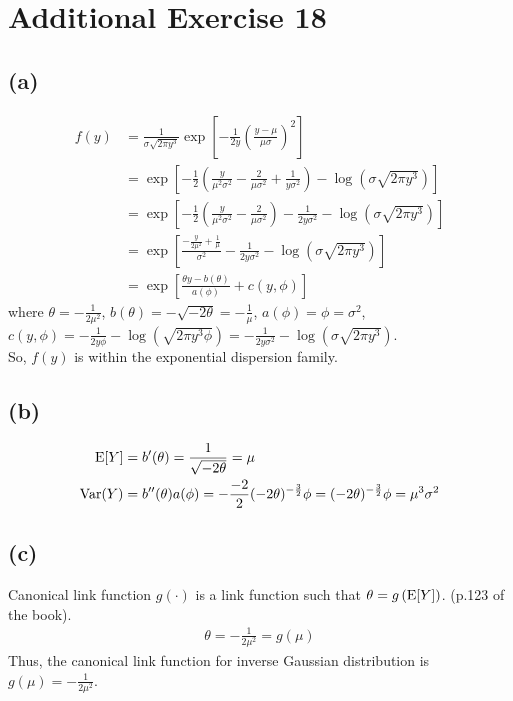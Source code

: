 \section*{Additional Exercise 18}
\subsection*{(a)}

\begin{align*}
f(y) &= \frac{1}{\sigma\sqrt{2\pi y^{3}}}\exp\left[-\frac{1}{2y}\left(\frac{y-\mu}{\mu\sigma}\right)^{2}\right]\\
&= \exp\left[-\frac{1}{2}\left(\frac{y}{\mu^{2}\sigma^{2}} -\frac{2}{\mu\sigma^{2}} + \frac{1}{y\sigma^{2}}\right) -\log\left(\sigma\sqrt{2\pi y^{3}}\right)\right]\\
&= \exp\left[-\frac{1}{2}\left(\frac{y}{\mu^{2}\sigma^{2}} -\frac{2}{\mu\sigma^{2}}\right) -\frac{1}{2y\sigma^{2}} -\log\left(\sigma\sqrt{2\pi y^{3}}\right)\right]\\
&= \exp\left[\frac{-\frac{y}{2\mu^{2}} +\frac{1}{\mu}}{\sigma^{2}} -\frac{1}{2y\sigma^{2}} -\log\left(\sigma\sqrt{2\pi y^{3}}\right)\right]\\
&= \exp\left[\frac{\theta y - b(\theta)}{a(\phi)} + c(y,\phi)\right]
\end{align*}
where $\theta = -\frac{1}{2\mu^{2}}$, $b(\theta) = -\sqrt{-2\theta}  = -\frac{1}{\mu}$, $a(\phi) = \phi = \sigma^{2}$, $c(y,\phi) = -\frac{1}{2y\phi} -\log\left(\sqrt{2\pi y^{3}\phi}\right) = -\frac{1}{2y\sigma^{2}} -\log\left(\sigma\sqrt{2\pi y^{3}}\right)$.\\
So, $f(y)$ is within the exponential dispersion family.\\

\subsection*{(b)}
\begin{align*}
\mathrm{E}[Y] &= b'(\theta) = \frac{1}{\sqrt{-2\theta}} = \mu\\
\mathrm{Var}(Y) &= b''(\theta)a(\phi) = -\frac{-2}{2}(-2\theta)^{-\frac{3}{2}}\phi = (-2\theta)^{-\frac{3}{2}}\phi = \mu^{3}\sigma^{2}\\
\end{align*}


\subsection*{(c)}
Canonical link function $g(\cdot)$ is a link function such that $\theta = g\left(\mathrm{E}[Y] \right)$. (p.123 of the book).
\begin{align*}
\theta = -\frac{1}{2\mu^{2}} = g(\mu)
\end{align*}
Thus, the canonical link function for inverse Gaussian distribution is $g(\mu) = -\frac{1}{2\mu^{2}}$.

